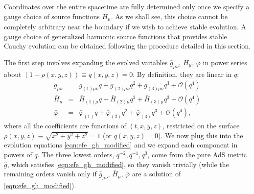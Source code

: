 \documentclass[a4paper,11pt]{article}
\begin{document}
Coordinates over the entire spacetime are fully determined only once we specify a gauge choice of source functions $H_\mu$. As we shall see, this choice cannot be completely arbitrary near the boundary if we wish to achieve stable evolution. A gauge choice of generalized harmonic source functions that provides stable Cauchy evolution can be obtained following the procedure detailed in this section.

The first step involves expanding the evolved variables $\bar{g}_{\mu \nu}$, $\bar{H}_{\mu}$, $\bar{\varphi}$ in power series about $(1-\rho(x,y,z)) \equiv q(x,y,z) = 0$. By definition, they are linear in $q$:
\begin{eqnarray}\label{eqn:qexp}
\bar{g}_{\mu \nu} &=& \bar{g}_{(1) \mu \nu} q + \bar{g}_{(2) \mu \nu} q^2 + \bar{g}_{(3) \mu \nu} q^3 + \mathcal{O}(q^4) \nonumber \\
\bar{H}_{\mu} &=& \bar{H}_{(1) \mu} q + \bar{H}_{(2) \mu} q^2 + \bar{H}_{(3) \mu} q^3 + \mathcal{O}(q^4) \nonumber \\
\bar{\varphi} &=& \bar{\varphi}_{(1)} q + \bar{\varphi}_{(2)} q^2 + \bar{\varphi}_{(3)} q^3 + \mathcal{O}(q^4),
\end{eqnarray}
where all the coefficients are functions of $(t,x,y,z)$, restricted on the surface $\rho(x,y,z)\equiv\sqrt{x^2+y^2+z^2}=1$ (or $q(x,y,z)=0$). We now plug this into the evolution equations \eqref{eqn:efe_gh_modified} and we expand each component in powers of $q$. The three lowest orders, $q^{-2},q^{-1},q^0$, come from the pure AdS metric $\hat{g}$, which satisfies \eqref{eqn:efe_gh_modified}, so they vanish trivially (while the remaining orders vanish only if $\bar{g}_{\mu \nu}$, $\bar{H}_{\mu}$, $\bar{\varphi}$ are a solution of \eqref{eqn:efe_gh_modified}).
\end{document}
